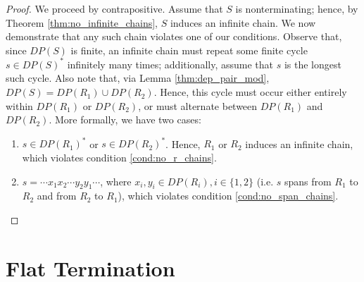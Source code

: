 \documentclass{article}
\begin{document}
\begin{proof}
    We proceed by contrapositive. Assume that $S$ is nonterminating; hence, by Theorem \ref{thm:no_infinite_chains}, $S$ induces an infinite chain. We now demonstrate that any such chain violates one of our conditions. Observe that, since $DP(S)$ is finite, an infinite chain must repeat some finite cycle $s \in DP(S)^*$ infinitely many times; additionally, assume that $s$ is the longest such cycle. Also note that, via Lemma \ref{thm:dep_pair_mod}, $DP(S) = DP(R_1) \cup DP(R_2)$. Hence, this cycle must occur either entirely within $DP(R_1)$ or $DP(R_2)$, or must alternate between $DP(R_1)$ and $DP(R_2)$. More formally, we have two cases: \begin{enumerate}
        \item $s \in DP(R_1)^*$ or  $s \in DP(R_2)^*$. Hence, $R_1$ or $R_2$ induces an infinite chain, which violates condition \eqref{cond:no_r_chains}. 
        
        \item $s = \cdots x_1 x_2 \cdots y_2 y_1 \cdots$, where $x_i, y_i \in DP(R_i), i \in \{1, 2\}$ (i.e. $s$ spans from $R_1$ to $R_2$ and from $R_2$ to $R_1$), which violates condition \eqref{cond:no_span_chains}. 
    \end{enumerate}
\end{proof}



\section{Flat Termination}
\end{document}
